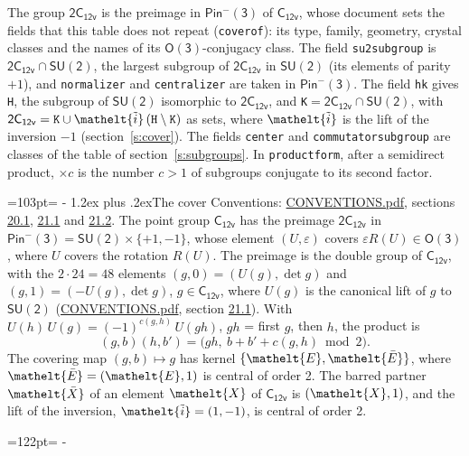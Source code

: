 \documentclass[10pt,a4paper]{article}
\makeatletter
\renewcommand\section{\@startsection{section}{1}{\z@}{-3ex plus -1ex minus -.2ex}%
  {1.2ex plus .2ex}{\normalfont\large\sffamily\bfseries\color{parttitle}}}
\newcommand{\needspace}[1]{\par\penalty-100\begingroup\dimen0=#1\relax\dimen2=\pagegoal
  \advance\dimen2-\pagetotal\ifdim\dimen0>\dimen2\relax\ifdim\dimen2>0pt\vfil\break\fi\fi
  \endgroup}
\numberwithin{equation}{section}
\newcommand{\eltfont}[1]{{\let\sigma\eltsigma\mathelt{#1}}}
\newcommand{\grp}[1]{\mathsf{#1}}
\newcommand{\elt}[1]{\eltfont{#1}}
\newcommand{\dirprod}{\times}
\newcommand{\barred}[1]{\bar{#1}}
\newcommand{\lift}[1]{\tilde{#1}}
\makeatother
\begin{document}
\leavevmode\label{n:element.inversion}\label{n:group.preimage}The group $\grp{2C_{12v}}$ is the preimage in $\grp{Pin^{-}(3)}$ of \href{../../../rotation/data/pdf/C12v.pdf}{$\grp{C_{12v}}$}, whose document sets the fields that this table does not repeat (\texttt{coverof}): its type, family, geometry, crystal classes and the names of its \href{../../../rotation/data/pdf/O3.pdf}{$\grp{O(3)}$}-conjugacy class. The field \texttt{su2subgroup} is $\grp{2C_{12v}} \cap \grp{SU(2)}$, the largest subgroup of $\grp{2C_{12v}}$ in $\grp{SU(2)}$ (its elements of parity $+1$), and \texttt{normalizer} and \texttt{centralizer} are taken in $\grp{Pin^{-}(3)}$. The field \texttt{hk} gives \texttt{H}, the subgroup of $\grp{SU(2)}$ isomorphic to $\grp{2C_{12v}}$, and \texttt{K}${} = \grp{2C_{12v}} \cap \grp{SU(2)}$, with $\grp{2C_{12v}} = \texttt{K} \cup \elt{\lift{i}}\,(\texttt{H} \setminus \texttt{K})$ as sets, where $\elt{\lift{i}}$ is the lift of the inversion $-1$ (section~\ref{s:cover}). The fields \texttt{center} and \texttt{commutatorsubgroup} are classes of the table of section~\ref{s:subgroups}.
\leavevmode\label{n:index.conjugates.c}In \texttt{productform}, after a semidirect product, ${\times}c$ is the number $c > 1$ of subgroups conjugate to its second factor.
\needspace{103pt}
\section{The cover}\label{s:cover}
Conventions: \href{../../CONVENTIONS.pdf}{CONVENTIONS.pdf}, sections \href{../../CONVENTIONS.pdf\#conv.20.1}{20.1}, \href{../../CONVENTIONS.pdf\#conv.21.1}{21.1} and \href{../../CONVENTIONS.pdf\#conv.21.2}{21.2}.
\leavevmode\label{n:group.pin.minus}\label{n:group.su2}\label{n:local.pin.sign}\label{n:matrix.covered}\label{n:matrix.lift.su2}\label{n:index.bar}The point group $\grp{C_{12v}}$ has the preimage $\grp{2C_{12v}}$ in $\grp{Pin^{-}(3)} = \grp{SU(2)} \dirprod \{+1, -1\}$, whose element $(U, \varepsilon)$ covers $\varepsilon R(U) \in \grp{O(3)}$, where $U$ covers the rotation $R(U)$. The preimage is the double group of $\grp{C_{12v}}$, with the $2 \cdot 24 = 48$ elements $(g, 0) = (U(g), \det g)$ and $(g, 1) = (-U(g), \det g)$, $g \in \grp{C_{12v}}$, where $U(g)$ is the canonical lift of $g$ to $\grp{SU(2)}$ (\href{../../CONVENTIONS.pdf}{CONVENTIONS.pdf}, section \href{../../CONVENTIONS.pdf\#conv.21.1}{21.1}). \label{n:function.cocycle}With $U(h)\,U(g) = (-1)^{c(g,h)}\,U(gh)$, $gh$ = first $g$, then $h$, the product is
\begin{equation}\label{e:product}(g, b)(h, b') = \bigl(gh,\ b + b' + c(g, h) \bmod 2\bigr).\end{equation}
\leavevmode\label{n:mark.bar}The covering map $(g, b) \mapsto g$ has kernel $\{\elt{E}, \elt{\barred{E}}\}$, where $\elt{\barred{E}} = (\elt{E}, 1)$ is central of order 2. \label{n:element.named}\label{n:mark.lift}The barred partner $\elt{\barred{X}}$ of an element $\elt{X}$ of $\grp{C_{12v}}$ is $(\elt{X}, 1)$, and the lift of the inversion, $\elt{\lift{i}} = (1, -1)$, is central of order 2.
\needspace{122pt}
\end{document}

